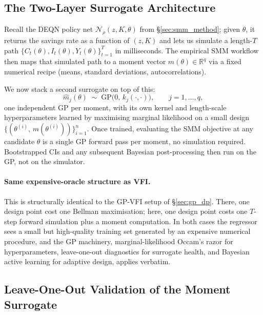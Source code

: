 \documentclass[11pt,a4paper]{report}
\newcommand{\R}{\mathbb{R}}
\begin{document}
\subsection{The Two-Layer Surrogate Architecture}

Recall the DEQN policy net $\mathcal{N}_\rho(z, K, \theta)$ from \S\ref{sec:smm_method}; given $\theta$, it returns the savings rate as a function of $(z, K)$ and lets us simulate a length-$T$ path $\{C_t(\theta), I_t(\theta), Y_t(\theta)\}_{t=1}^T$ in milliseconds.  The empirical SMM workflow then maps that simulated path to a moment vector $m(\theta) \in \R^q$ via a fixed numerical recipe (means, standard deviations, autocorrelations).

We now stack a second surrogate on top of this:
\begin{equation}
\widehat m_j(\theta) \;\sim\; \mathrm{GP}\bigl(0,\, k_j(\cdot, \cdot)\bigr), \qquad j = 1, \ldots, q,
\label{eq:moment_gp}
\end{equation}
one independent GP per moment, with its own kernel and length-scale hyperparameters learned by maximising marginal likelihood on a small design $\{(\theta^{(i)},\, m(\theta^{(i)}))\}_{i=1}^n$.  Once trained, evaluating the SMM objective at any candidate $\theta$ is a single GP forward pass per moment, no simulation required.  Bootstrapped CIs and any subsequent Bayesian post-processing then run on the GP, not on the simulator.

\paragraph{Same expensive-oracle structure as VFI.}
This is structurally identical to the GP-VFI setup of \S\ref{sec:gp_dp}.  There, one design point cost one Bellman maximisation; here, one design point costs one $T$-step forward simulation plus a moment computation.  In both cases the regressor sees a small but high-quality training set generated by an expensive numerical procedure, and the GP machinery, marginal-likelihood Occam's razor for hyperparameters, leave-one-out diagnostics for surrogate health, and Bayesian active learning for adaptive design, applies verbatim.

\subsection{Leave-One-Out Validation of the Moment Surrogate}
\end{document}
